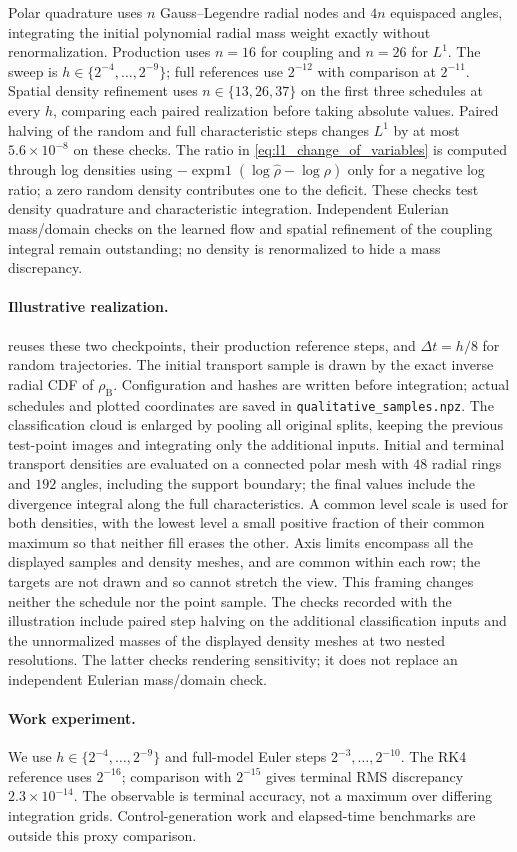 Polar quadrature uses $n$ Gauss--Legendre radial nodes and $4n$ equispaced angles, integrating the initial polynomial radial mass weight exactly without renormalization. Production uses $n=16$ for coupling and $n=26$ for $L^1$. The sweep is $h\in\{2^{-4},\ldots,2^{-9}\}$; full references use $2^{-12}$ with comparison at $2^{-11}$. Spatial density refinement uses $n\in\{13,26,37\}$ on the first three schedules at every $h$, comparing each paired realization before taking absolute values. Paired halving of the random and full characteristic steps changes $L^1$ by at most $5.6\times10^{-8}$ on these checks. The ratio in \eqref{eq:l1_change_of_variables} is computed through log densities using $-\operatorname{expm1}(\log\hat\rho-\log\rho)$ only for a negative log ratio; a zero random density contributes one to the deficit. These checks test density quadrature and characteristic integration. Independent Eulerian mass/domain checks on the learned flow and spatial refinement of the coupling integral remain outstanding; no density is renormalized to hide a mass discrepancy.

\paragraph{Illustrative realization.}
 reuses these two checkpoints, their production reference steps, and $\Delta t=h/8$ for random trajectories. The initial transport sample is drawn by the exact inverse radial CDF of $\rho_{\mathrm B}$. Configuration and hashes are written before integration; actual schedules and plotted coordinates are saved in \texttt{qualitative\_samples.npz}. The classification cloud is enlarged by pooling all original splits, keeping the previous test-point images and integrating only the additional inputs. Initial and terminal transport densities are evaluated on a connected polar mesh with $48$ radial rings and $192$ angles, including the support boundary; the final values include the divergence integral along the full characteristics. A common level scale is used for both densities, with the lowest level a small positive fraction of their common maximum so that neither fill erases the other. Axis limits encompass all the displayed samples and density meshes, and are common within each row; the targets are not drawn and so cannot stretch the view. This framing changes neither the schedule nor the point sample. The checks recorded with the illustration include paired step halving on the additional classification inputs and the unnormalized masses of the displayed density meshes at two nested resolutions. The latter checks rendering sensitivity; it does not replace an independent Eulerian mass/domain check.

\paragraph{Work experiment.}
We use $h\in\{2^{-4},\ldots,2^{-9}\}$ and full-model Euler steps $2^{-3},\ldots,2^{-10}$. The RK4 reference uses $2^{-16}$; comparison with $2^{-15}$ gives terminal RMS discrepancy $2.3\times10^{-14}$. The observable is terminal accuracy, not a maximum over differing integration grids. Control-generation work and elapsed-time benchmarks are outside this proxy comparison.
